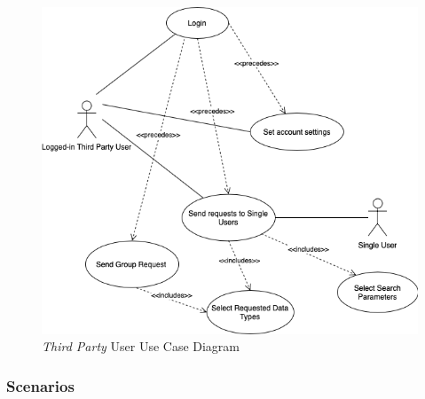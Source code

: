 \documentclass[titlepage]{article}
\begin{document}
		\begin{figure}[H]
  			\includegraphics[width=\linewidth]{Diagrammi/ThirdPartyUseCase.png}
  			\caption{{\it Third Party} User Use Case Diagram}
 			 \label{fig:ThirdPartyUseCase}
		\end{figure}

		\subsubsection{Scenarios}
			
\end{document}
